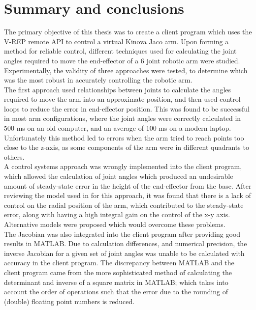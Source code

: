 \documentclass[12pt,openany,a4paper]{book}
\begin{document}
\section{Summary and conclusions}
The primary objective of this thesis was to create a client program which uses the V-REP remote API to control a virtual Kinova Jaco arm. Upon forming a method for reliable control, different techniques used for calculating the joint angles required to move the end-effector of a 6 joint robotic arm were studied. Experimentally, the validity of three approaches were tested, to determine which was the most robust in accurately controlling the robotic arm. \\

The first approach used relationships between joints to calculate the angles required to move the arm into an approximate position, and then used control loops to reduce the error in end-effector position. This was found to be successful in most arm configurations, where the joint angles were correctly calculated in 500 ms on an old computer, and an average of 100 ms on a modern laptop. Unfortunately this method led to errors when the arm tried to reach points too close to the z-axis, as some components of the arm were in different quadrants to others.\\

A control systems approach was wrongly implemented into the client program, which allowed the calculation of joint angles which produced an undesirable amount of steady-state error in the height of the end-effector from the base. After reviewing the model used in for this approach, it was found that there is a lack of control on the radial position of the arm, which contributed to the steady-state error, along with having a high integral gain on the control of the x-y axis. Alternative models were proposed which would overcome these problems.\\

The Jacobian was also integrated into the client program after providing good results in MATLAB. Due to calculation differences, and numerical precision, the inverse Jacobian for a given set of joint angles was unable to be calculated with accuracy in the client program. The discrepancy between MATLAB and the client program came from the more sophisticated method of calculating the determinant and inverse of a square matrix in MATLAB; which takes into account the order of operations such that the error due to the rounding of (double) floating point numbers is reduced.\\
\end{document}
